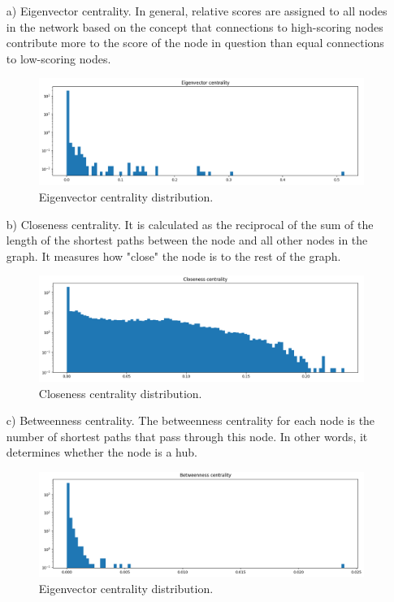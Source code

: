 \begin{itemize}
\item[a)] Eigenvector centrality. In general, relative scores are assigned to all nodes in the network based on the concept that connections to high-scoring nodes contribute more to the score of the node in question than equal connections to low-scoring nodes.
\begin{figure}[h]
\centering
\includegraphics[width=1\linewidth]{centralities_eigenvector.png}
\caption{Eigenvector centrality distribution.} \label{plot:centrality:eigenvector}
\end{figure}
\item[b)] Closeness centrality. It is calculated as the reciprocal of the sum of the length of the shortest paths between the node and all other nodes in the graph. It measures how "close" the node is to the rest of the graph.
\begin{figure}[h]
\centering
\includegraphics[width=1\linewidth]{centralities_closeness.png}
\caption{Closeness centrality distribution.} \label{plot:centrality:closeness}
\end{figure}
\item[c)] Betweenness centrality. The betweenness centrality for each node is the number of shortest paths that pass through this node. In other words, it determines whether the node is a hub.
\begin{figure}[h]
\centering
\includegraphics[width=1\linewidth]{centralities_betweenness.png}
\caption{Eigenvector centrality distribution.} \label{plot:centrality:betweenness}
\end{figure}
\end{itemize}

